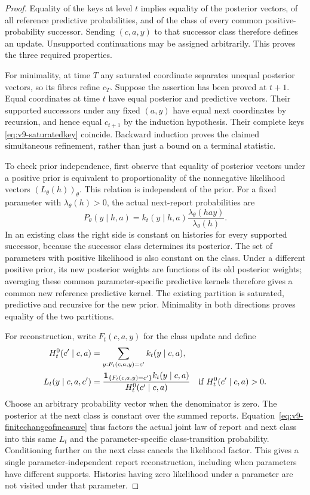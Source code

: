 \begin{proof}
Equality of the keys at level $t$ implies equality of the posterior
vectors, of all reference predictive probabilities, and of the class of
every common positive-probability successor. Sending $(c,a,y)$ to that
successor class therefore defines an update. Unsupported continuations
may be assigned arbitrarily. This proves the three required properties.

For minimality, at time $T$ any saturated coordinate separates unequal
posterior vectors, so its fibres refine $c_T$. Suppose the assertion has
been proved at $t+1$. Equal coordinates at time $t$ have equal posterior
and predictive vectors. Their supported successors under any fixed
$(a,y)$ have equal next coordinates by recursion, and hence equal
$c_{t+1}$ by the induction hypothesis. Their complete keys
\eqref{eq:v9-saturatedkey} coincide. Backward induction proves the
claimed simultaneous refinement, rather than just a bound on a terminal
statistic.

To check prior independence, first observe that equality of posterior
vectors under a positive prior is equivalent to proportionality of the
nonnegative likelihood vectors $(L_\theta(h))_\theta$. This relation is
independent of the prior. For a fixed parameter with
$\lambda_\theta(h)>0$, the actual next-report probabilities are
\begin{equation}
 P_\theta(y\mid h,a)
   =k_t(y\mid h,a)\frac{\lambda_\theta(hay)}{\lambda_\theta(h)}.
 \label{eq:v9-finitechangeofmeasure}
\end{equation}
In an existing class the right side is constant on histories for every
supported successor, because the successor class determines its
posterior. The set of parameters with positive likelihood is also
constant on the class. Under a different positive prior, its new
posterior weights are functions of its old posterior weights; averaging
these common parameter-specific predictive kernels therefore gives a
common new reference predictive kernel. The existing partition is
saturated, predictive and recursive for the new prior. Minimality in
both directions proves equality of the two partitions.

For reconstruction, write $F_t(c,a,y)$ for the class update and define
\begin{align*}
 H_t^0(c'\mid c,a)&=\sum_{y:F_t(c,a,y)=c'}k_t(y\mid c,a),\\
 L_t(y\mid c,a,c')&=
 \frac{\mathbf 1_{\{F_t(c,a,y)=c'\}}k_t(y\mid c,a)}{H_t^0(c'\mid c,a)}
                 \quad\text{if }H_t^0(c'\mid c,a)>0.
\end{align*}
Choose an arbitrary probability vector when the denominator is zero.
The posterior at the next class is constant over the summed reports.
Equation~\eqref{eq:v9-finitechangeofmeasure} thus factors the actual
joint law of report and next class into this same $L_t$ and the
parameter-specific class-transition probability. Conditioning further
on the next class cancels the likelihood factor. This gives a single
parameter-independent report reconstruction, including when parameters
have different supports. Histories having zero likelihood under a
parameter are not visited under that parameter.


\end{proof}
